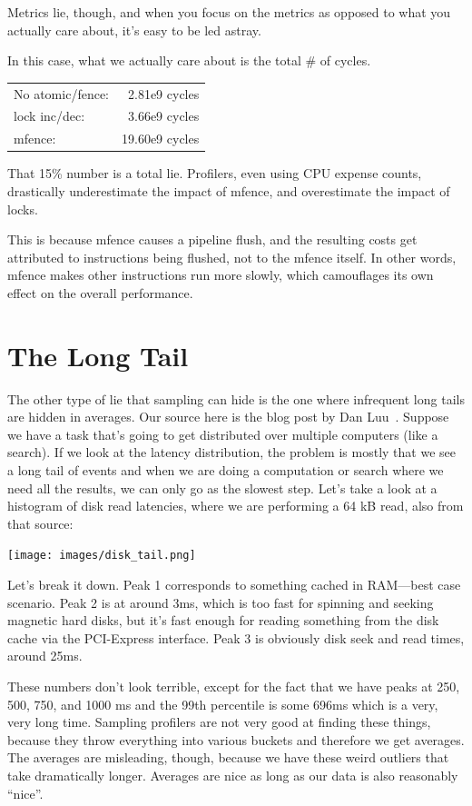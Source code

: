 \documentclass[a4paper]{report}
\begin{document}
Metrics lie, though, and when you focus on the metrics as opposed to what you
actually care about, it's easy to be led astray.

In this case, what we actually care about is the total \# of cycles.

    \begin{tabular}{lr}
    No atomic/fence:& 2.81e9 cycles\\
    lock inc/dec: & 3.66e9 cycles\\
    mfence: & 19.60e9 cycles
    \end{tabular}

That 15\% number is a total lie.
Profilers, even using CPU expense counts, drastically underestimate the impact of mfence,
and overestimate the impact of locks.

This is because mfence causes a pipeline flush, and the resulting 
costs get attributed to instructions being flushed, not to the mfence itself. In other
words, mfence makes other instructions run more slowly, which camouflages its own effect
on the overall performance.


\section*{The Long Tail}

The other type of lie that sampling can hide is the one where infrequent long tails are hidden in averages.
Our source here is the blog post by Dan Luu~\cite{perf-tracing}. Suppose we have a task that's going to get distributed over multiple computers (like a search). If we look at the latency distribution, the problem is mostly that we see a long tail of events and when we are doing a computation or search where we need all the results, we can only go as the slowest step. Let's take a look at a histogram of disk read latencies, where we are performing a 64 kB read, also from that source:

\begin{center}
	\texttt{[image: images/disk\_tail.png]}
\end{center}

Let's break it down. Peak 1 corresponds to something cached in RAM---best case scenario. Peak 2 is at around 3ms, which is too fast for spinning and seeking magnetic hard disks, but it's fast enough for reading something from the disk cache via the PCI-Express interface. Peak 3 is obviously disk seek and read times, around 25ms. 

These numbers don't look terrible, except for the fact that we have peaks at 250, 500, 750, and 1000 ms and the 99th percentile is some 696ms which is a very, very long time. Sampling profilers are not very good at finding these things, because they throw everything into various buckets and therefore we get averages. The averages are misleading, though, because we have these weird outliers that take dramatically longer. Averages are nice as long as our data is also reasonably ``nice''.
\end{document}
